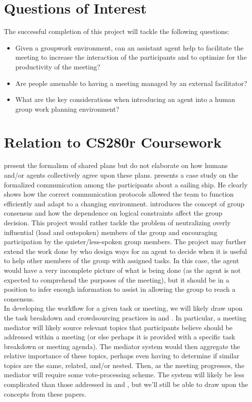 \documentclass[final,authoryear,11pt,times]{elsarticle}
\begin{document}
\section{Questions of Interest}
	\label{sec:question_o_i}
	The successful completion of this project will tackle the following questions:
	\begin{itemize}
		\item Given a groupwork environment, can an assistant agent help to facilitate the meeting to increase the interaction of the participants and to optimize for the productivity of the meeting?
		\item Are people amenable to having a meeting managed by an external facilitator?
		\item What are the key considerations when introducing an agent into a human group work planning environment?
	\end{itemize}

\section{Relation to CS280r Coursework}
	\label{sec:coursework}
	\citet{grosz2006dynamics} present the formalism of shared plans but do not elaborate on how humans and/or agents collectively agree upon these plans. \citet{hutchins1995cognition} presents a case study on the formalized communication among the participants about a sailing ship. He clearly shows how the correct communication protocols allowed the team to function efficiently and adapt to a changing environment. \citet{friedkin2016network} introduces the concept of group consensus and how the dependence on logical constraints affect the group decision. This project would rather tackle the problem of neutralizing overly influential (load and outspoken) members of the group and encouraging participation by the quieter/less-spoken group members. The project may further extend the work done by \citet{kamar2009incorporating} who design ways for an agent to decide when it is useful to help other members of the group with assigned tasks. In this case, the agent would have a very incomplete picture of what is being done (as the agent is not expected to comprehend the purposes of the meeting), but it should be in a position to infer enough information to assist in allowing the group to reach a consensus. \\
	In developing the workflow for a given task or meeting, we will likely draw upon the task breakdown and crowdsourcing practices in \citet{hahn2016knowledge} and \citet{chilton2013cascade}. In particular, a meeting mediator will likely source relevant topics that participants believe should be addressed within a meeting (or else perhaps it is provided with a specific task breakdown or meeting agenda). The mediator system would then aggregate the relative importance of these topics, perhaps even having to determine if similar topics are the same, related, and/or nested. Then, as the meeting progresses, the mediator will require some vote-processing scheme. The system will likely be less complicated than those addressed in \citet{benade2016preference} and \citet{procaccia2016voting}, but we'll still be able to draw upon the concepts from these papers.
\end{document}
